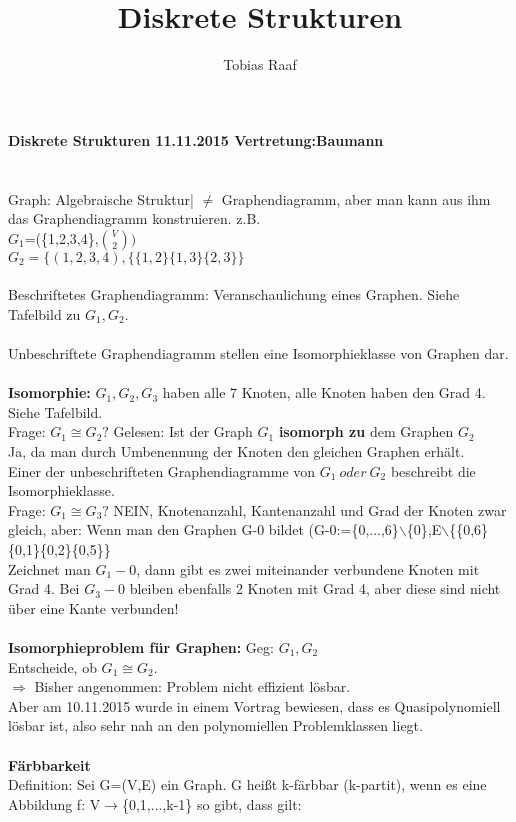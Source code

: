 \documentclass{scrartcl}
\title{Diskrete Strukturen}
\author{Tobias Raaf}
\begin{document}
	\large \textbf{Diskrete Strukturen 11.11.2015 Vertretung:Baumann}\\\\
	\normalsize\\ Graph: Algebraische Struktur| $\neq$ Graphendiagramm, aber man kann aus ihm das Graphendiagramm konstruieren. z.B. \\$G_1$=(\{1,2,3,4\},$\binom{V}{2})$\\
	$G_2=\{(1,2,3,4),\{\{1,2\}\{1,3\}\{2,3\}\}$\\\\
	Beschriftetes Graphendiagramm: Veranschaulichung eines Graphen. Siehe Tafelbild zu $G_1,G_2$.\\\\
	Unbeschriftete Graphendiagramm stellen eine Isomorphieklasse von Graphen dar.\\\\
	\textbf{Isomorphie:} $G_1, G_2, G_3$ haben alle 7 Knoten, alle Knoten haben den Grad 4.\\ Siehe Tafelbild.\\
	Frage: $G_1\cong G_2?$ Gelesen: Ist der Graph $G_1$ \textbf{isomorph zu} dem Graphen $G_2$\\
	Ja, da man durch Umbenennung der Knoten den gleichen Graphen erhält.\\
	Einer der unbeschrifteten Graphendiagramme von $G_1~oder~G_2$ beschreibt die Isomorphieklasse.\\
	Frage: $G_1\cong G_3?$ NEIN, Knotenanzahl, Kantenanzahl und Grad der Knoten zwar gleich, aber: Wenn man den Graphen G-0 bildet (G-0:=\{0,...,6\}$\backslash$\{0\},E$\backslash$\{\{0,6\}\{0,1\}\{0,2\}\{0,5\}\}\\
	Zeichnet man $G_1-0$, dann gibt es zwei miteinander verbundene Knoten mit Grad 4. Bei $G_3-0$ bleiben ebenfalls 2 Knoten mit Grad 4, aber diese sind nicht über eine Kante verbunden!\\
	\\
	\textbf{Isomorphieproblem für  Graphen:} Geg: $G_1,G_2$\\
	Entscheide, ob $G_1\cong G_2$.\\
	$\Rightarrow$ Bisher angenommen: Problem nicht effizient lösbar.\\ Aber am 10.11.2015 wurde in einem Vortrag bewiesen, dass es Quasipolynomiell lösbar ist, also sehr nah an den polynomiellen Problemklassen liegt.\\\\
	\textbf{Färbbarkeit}\\
	Definition: Sei G=(V,E) ein Graph. G heißt k-färbbar (k-partit), wenn es eine Abbildung f: V$\rightarrow$\{0,1,...,k-1\} so gibt, dass gilt:\\
\end{document}

